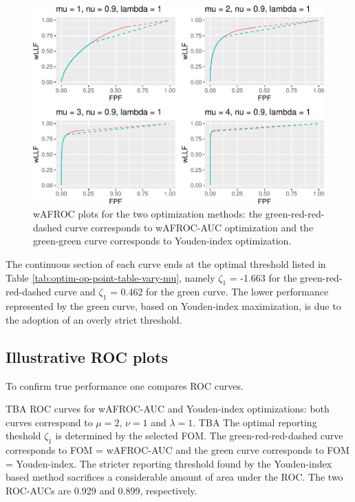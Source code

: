 \documentclass[
]{book}
\begin{document}
\begin{figure}
\centering
\includegraphics{21-optim-op-point_files/figure-latex/optim-op-point-vary-mu-wafroc-1.pdf}
\caption{\label{fig:optim-op-point-vary-mu-wafroc}wAFROC plots for the two optimization methods: the green-red-red-dashed curve corresponds to wAFROC-AUC optimization and the green-green curve corresponds to Youden-index optimization.}
\end{figure}

The continuous section of each curve ends at the optimal threshold listed in Table \ref{tab:optim-op-point-table-vary-mu}, namely \(\zeta_1\) = -1.663 for the green-red-red-dashed curve and \(\zeta_1\) = 0.462 for the green curve. The lower performance represented by the green curve, based on Youden-index maximization, is due to the adoption of an overly strict threshold.

\hypertarget{illustrative-roc-plots-1}{%
\subsection{Illustrative ROC plots}\label{illustrative-roc-plots-1}}

To confirm true performance one compares ROC curves.

TBA ROC curves for wAFROC-AUC and Youden-index optimizations: both curves correspond to \(\mu = 2\), \(\nu = 1\) and \(\lambda = 1\). TBA The optimal reporting theshold \(\zeta_1\) is determined by the selected FOM. The green-red-red-dashed curve corresponds to FOM = wAFROC-AUC and the green curve corresponds to FOM = Youden-index. The stricter reporting threshold found by the Youden-index based method sacrifices a considerable amount of area under the ROC. The two ROC-AUCs are 0.929 and 0.899, respectively.
\end{document}
